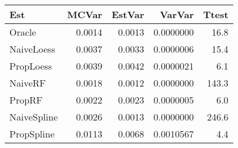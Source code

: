 
\begin{tabular}{lrrrr}
\toprule
Est & MCVar & EstVar & VarVar & Ttest\\
\midrule
Oracle & 0.0014 & 0.0013 & 0.0000000 & 16.8\\
NaiveLoess & 0.0037 & 0.0033 & 0.0000006 & 15.4\\
PropLoess & 0.0039 & 0.0042 & 0.0000021 & 6.1\\
NaiveRF & 0.0018 & 0.0012 & 0.0000000 & 143.3\\
PropRF & 0.0022 & 0.0023 & 0.0000005 & 6.0\\
NaiveSpline & 0.0026 & 0.0013 & 0.0000000 & 246.6\\
PropSpline & 0.0113 & 0.0068 & 0.0010567 & 4.4\\
\bottomrule
\end{tabular}